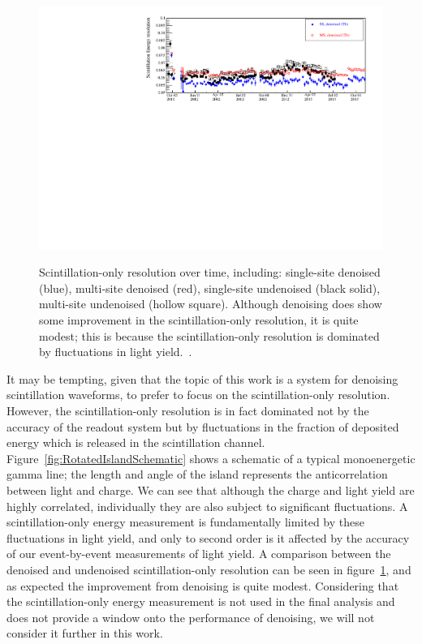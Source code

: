 \begin{figure}
\begin{center}
\includegraphics[keepaspectratio=true,width=\textwidth]{scint_resolutions_denoised.pdf}
\end{center}
\renewcommand{\baselinestretch}{1}
\small\normalsize
\begin{quote}
\caption{Scintillation-only resolution over time, including: single-site denoised (blue), multi-site denoised (red), single-site undenoised (black solid), multi-site undenoised (hollow square).  Although denoising does show some improvement in the scintillation-only resolution, it is quite modest; this is because the scintillation-only resolution is dominated by fluctuations in light yield.~\cite{EnergyDocumentRun2ab}.}
\label{fig:ScintillationOnlyResolutionTrend}
\end{quote}
\end{figure}
\renewcommand{\baselinestretch}{2}
\small\normalsize

It may be tempting, given that the topic of this work is a system for denoising scintillation waveforms, to prefer to focus on the scintillation-only resolution.  However, the scintillation-only resolution is in fact dominated not by the accuracy of the readout system but by fluctuations in the fraction of deposited energy which is released in the scintillation channel.  Figure~\ref{fig:RotatedIslandSchematic} shows a schematic of a typical monoenergetic gamma line; the length and angle of the island represents the anticorrelation between light and charge.  We can see that although the charge and light yield are highly correlated, individually they are also subject to significant fluctuations.  A scintillation-only energy measurement is fundamentally limited by these fluctuations in light yield, and only to second order is it affected by the accuracy of our event-by-event measurements of light yield.  A comparison between the denoised and undenoised scintillation-only resolution can be seen in figure~\ref{fig:ScintillationOnlyResolutionTrend}, and as expected the improvement from denoising is quite modest.  Considering that the scintillation-only energy measurement is not used in the final analysis and does not provide a window onto the performance of denoising, we will not consider it further in this work.

